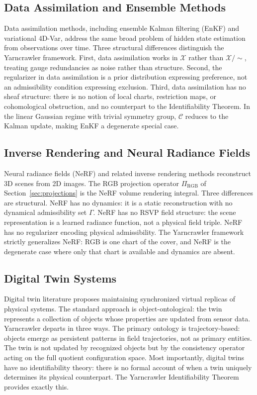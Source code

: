 \documentclass[11pt, oneside]{article}
\newcommand{\Xmod}{\mathcal{X}/{\sim}}
\begin{document}
\subsection{Data Assimilation and Ensemble Methods}

Data assimilation methods, including ensemble Kalman filtering (EnKF) and variational
4D-Var, address the same broad problem of hidden state estimation from observations over
time. Three structural differences distinguish the Yarncrawler framework. First, data
assimilation works in $\mathcal{X}$ rather than $\Xmod$, treating gauge redundancies as
noise rather than structure. Second, the regularizer in data assimilation is a prior
distribution expressing preference, not an admissibility condition expressing exclusion.
Third, data assimilation has no sheaf structure: there is no notion of local charts,
restriction maps, or cohomological obstruction, and no counterpart to the Identifiability
Theorem. In the linear Gaussian regime with trivial symmetry group, $\mathcal{C}$ reduces
to the Kalman update, making EnKF a degenerate special case.

\subsection{Inverse Rendering and Neural Radiance Fields}

Neural radiance fields (NeRF) and related inverse rendering methods reconstruct 3D scenes
from 2D images. The RGB projection operator $\Pi_{\mathrm{RGB}}$ of
Section~\ref{sec:projections} is the NeRF volume rendering integral. Three differences
are structural. NeRF has no dynamics: it is a static reconstruction with no dynamical
admissibility set $\Gamma$. NeRF has no RSVP field structure: the scene representation
is a learned radiance function, not a physical field triple. NeRF has no regularizer
encoding physical admissibility. The Yarncrawler framework strictly generalizes NeRF: RGB
is one chart of the cover, and NeRF is the degenerate case where only that chart is
available and dynamics are absent.

\subsection{Digital Twin Systems}

Digital twin literature proposes maintaining synchronized virtual replicas of physical
systems. The standard approach is object-ontological: the twin represents a collection of
objects whose properties are updated from sensor data. Yarncrawler departs in three ways.
The primary ontology is trajectory-based: objects emerge as persistent patterns in field
trajectories, not as primary entities. The twin is not updated by recognized objects but
by the consistency operator acting on the full quotient configuration space. Most
importantly, digital twins have no identifiability theory: there is no formal account of
when a twin uniquely determines its physical counterpart. The Yarncrawler Identifiability
Theorem provides exactly this.
\end{document}
